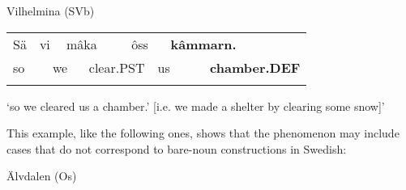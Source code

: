 \begin{listWWNumileveli}
\item {}

\begin{styleExample}
Vilhelmina (SVb)

\end{styleExample}

\end{listWWNumileveli}

\begin{tabular}{llllllllll}
\lsptoprule
Sä & \multicolumn{2}{l}{vi

} & \multicolumn{2}{l}{mâka

} & \multicolumn{2}{l}{ôss

} & \multicolumn{2}{l}{{\bfseries kâmmarn.}

} & \\
\multicolumn{2}{l}{so

} & \multicolumn{2}{l}{we

} & \multicolumn{2}{l}{clear.PST

} & \multicolumn{2}{l}{us

} & \multicolumn{2}{l}{{\bfseries chamber.DEF}

}\\
\lspbottomrule
\end{tabular}

\begin{styleTranslation}
‘so we cleared us a chamber.’ [i.e. we made a shelter by clearing some snow]’

\end{styleTranslation}

\begin{styleBodyTextFirst}
This example, like the following ones, shows that the phenomenon may include cases that do not correspond to bare-noun constructions in Swedish: 

\end{styleBodyTextFirst}

\begin{listWWNumileveli}
\item {}

\begin{styleExample}
Älvdalen (Os)

\end{styleExample}

\end{listWWNumileveli}

\begin{listWWNumxciileveli}
\item {}

\end{listWWNumxciileveli}

